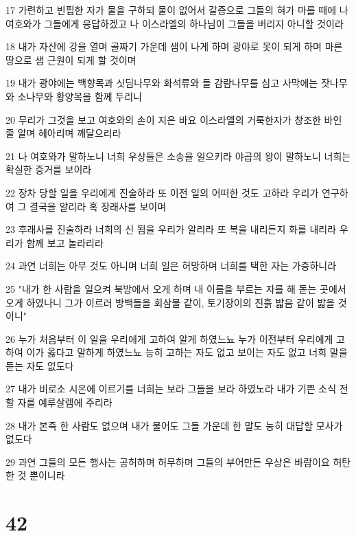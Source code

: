 \par 17 가련하고 빈핍한 자가 물을 구하되 물이 없어서 갈증으로 그들의 혀가 마를 때에 나 여호와가 그들에게 응답하겠고 나 이스라엘의 하나님이 그들을 버리지 아니할 것이라
\par 18 내가 자산에 강을 열며 골짜기 가운데 샘이 나게 하며 광야로 못이 되게 하며 마른 땅으로 샘 근원이 되게 할 것이며
\par 19 내가 광야에는 백향목과 싯딤나무와 화석류와 들 감람나무를 심고 사막에는 잣나무와 소나무와 황양목을 함께 두리니
\par 20 무리가 그것을 보고 여호와의 손이 지은 바요 이스라엘의 거룩한자가 창조한 바인 줄 알며 헤아리며 깨달으리라
\par 21 나 여호와가 말하노니 너희 우상들은 소송을 일으키라 야곱의 왕이 말하노니 너희는 확실한 증거를 보이라
\par 22 장차 당할 일을 우리에게 진술하라 또 이전 일의 어떠한 것도 고하라 우리가 연구하여 그 결국을 알리라 혹 장래사를 보이며
\par 23 후래사를 진술하라 너희의 신 됨을 우리가 알리라 또 복을 내리든지 화를 내리라 우리가 함께 보고 놀라리라
\par 24 과연 너희는 아무 것도 아니며 너희 일은 허망하며 너희를 택한 자는 가증하니라
\par 25 "내가 한 사람을 일으켜 북방에서 오게 하며 내 이름을 부르는 자를 해 돋는 곳에서 오게 하였나니 그가 이르러 방백들을 회삼물 같이, 토기장이의 진흙 밟음 같이 밟을 것이니"
\par 26 누가 처음부터 이 일을 우리에게 고하여 알게 하였느뇨 누가 이전부터 우리에게 고하여 이가 옳다고 말하게 하였느뇨 능히 고하는 자도 없고 보이는 자도 없고 너희 말을 듣는 자도 없도다
\par 27 내가 비로소 시온에 이르기를 너희는 보라 그들을 보라 하였노라 내가 기쁜 소식 전할 자를 예루살렘에 주리라
\par 28 내가 본즉 한 사람도 없으며 내가 물어도 그들 가운데 한 말도 능히 대답할 모사가 없도다
\par 29 과연 그들의 모든 행사는 공허하며 허무하며 그들의 부어만든 우상은 바람이요 허탄한 것 뿐이니라

\chapter{42}

